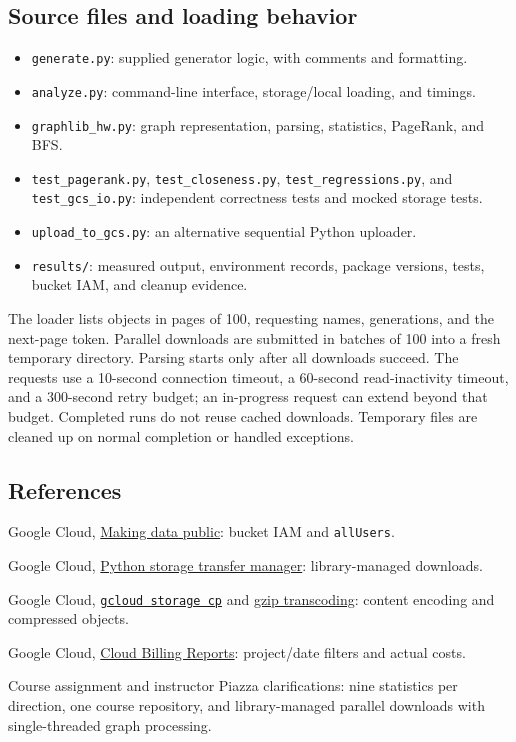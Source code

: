\documentclass[10pt,letterpaper]{article}
\begin{document}
\subsection{Source files and loading behavior}
\begin{itemize}
\item \texttt{generate.py}: supplied generator logic, with comments and formatting.
\item \texttt{analyze.py}: command-line interface, storage/local loading, and timings.
\item \texttt{graphlib\_hw.py}: graph representation, parsing, statistics, PageRank, and BFS.
\item \texttt{test\_pagerank.py}, \texttt{test\_closeness.py},
\texttt{test\_regressions.py}, and \texttt{test\_gcs\_io.py}: independent correctness tests and mocked storage tests.
\item \texttt{upload\_to\_gcs.py}: an alternative sequential Python uploader.
\item \texttt{results/}: measured output, environment records, package versions, tests, bucket IAM, and cleanup evidence.
\end{itemize}
The loader lists objects in pages of 100, requesting names, generations, and the
next-page token. Parallel downloads are submitted in batches of 100 into a fresh
temporary directory. Parsing starts only after all downloads succeed. The
requests use a 10-second connection timeout, a 60-second read-inactivity timeout,
and a 300-second retry budget; an in-progress request can extend beyond that
budget. Completed runs do not reuse cached downloads. Temporary files are
cleaned up on normal completion or handled exceptions.

\subsection{References}
\begin{enumerate}[label={[\arabic*]}]
\item Google Cloud, \href{https://docs.cloud.google.com/storage/docs/access-control/making-data-public}{Making data public}: bucket IAM and \texttt{allUsers}.
\item Google Cloud, \href{https://docs.cloud.google.com/python/docs/reference/storage/latest/google.cloud.storage.transfer_manager}{Python storage transfer manager}: library-managed downloads.
\item Google Cloud, \href{https://docs.cloud.google.com/sdk/gcloud/reference/storage/cp}{\texttt{gcloud storage cp}} and \href{https://docs.cloud.google.com/storage/docs/transcoding}{gzip transcoding}: content encoding and compressed objects.
\item Google Cloud, \href{https://docs.cloud.google.com/billing/docs/how-to/reports}{Cloud Billing Reports}: project/date filters and actual costs.
\item Course assignment and instructor Piazza clarifications: nine statistics per direction, one course repository, and library-managed parallel downloads with single-threaded graph processing.
\end{enumerate}
\end{document}
